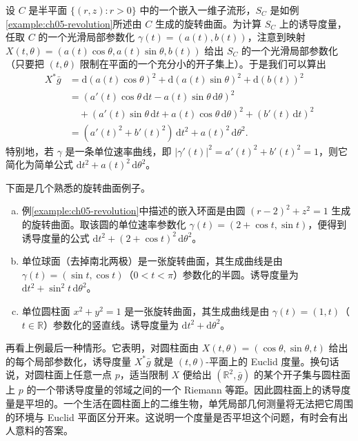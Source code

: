 \documentclass[../../main.tex]{subfiles}
\begin{document}
\begin{example}[旋转曲面上的诱导度量]\label{example:ch13-revolution}
设 $C$ 是半平面 $\{(r,z):r>0\}$ 中的一个嵌入一维子流形，$S_C$ 是如例\ref{example:ch05-revolution}所述由 $C$ 生成的旋转曲面。为计算 $S_C$ 上的诱导度量，任取 $C$ 的一个光滑局部参数化 $\gamma(t)=(a(t),b(t))$，注意到映射 $X(t,\theta)=(a(t)\cos\theta,a(t)\sin\theta,b(t))$ 给出 $S_C$ 的一个光滑局部参数化（只要把 $(t,\theta)$ 限制在平面的一个充分小的开子集上）。于是我们可以算出
\begin{align*}
X^*\bar g&=\mathrm{d}(a(t)\cos\theta)^2+\mathrm{d}(a(t)\sin\theta)^2+\mathrm{d}(b(t))^2\\
&=(a'(t)\cos\theta\,\mathrm{d}t-a(t)\sin\theta\,\mathrm{d}\theta)^2\\
&\quad+(a'(t)\sin\theta\,\mathrm{d}t+a(t)\cos\theta\,\mathrm{d}\theta)^2+(b'(t)\,\mathrm{d}t)^2\\
&=(a'(t)^2+b'(t)^2)\,\mathrm{d}t^2+a(t)^2\,\mathrm{d}\theta^2.
\end{align*}
特别地，若 $\gamma$ 是一条单位速率曲线，即 $|\gamma'(t)|^2=a'(t)^2+b'(t)^2=1$，则它简化为简单公式 $\mathrm{d}t^2+a(t)^2\,\mathrm{d}\theta^2$。

下面是几个熟悉的旋转曲面例子。
\begin{enumerate}[(a)]
\item 例\ref{example:ch05-revolution}中描述的嵌入环面是由圆 $(r-2)^2+z^2=1$ 生成的旋转曲面。取该圆的单位速率参数化 $\gamma(t)=(2+\cos t,\sin t)$，便得到诱导度量的公式 $\mathrm{d}t^2+(2+\cos t)^2\,\mathrm{d}\theta^2$。
\item 单位球面（去掉南北两极）是一张旋转曲面，其生成曲线是由 $\gamma(t)=(\sin t,\cos t)$（$0<t<\pi$）参数化的半圆。诱导度量为 $\mathrm{d}t^2+\sin^2 t\,\mathrm{d}\theta^2$。
\item 单位圆柱面 $x^2+y^2=1$ 是一张旋转曲面，其生成曲线是由 $\gamma(t)=(1,t)$（$t\in\mathbb{R}$）参数化的竖直线。诱导度量为 $\mathrm{d}t^2+\mathrm{d}\theta^2$。
\end{enumerate}
\end{example}

再看上例最后一种情形。它表明，对圆柱面由 $X(t,\theta)=(\cos\theta,\sin\theta,t)$ 给出的每个局部参数化，诱导度量 $X^*\bar g$ 就是 $(t,\theta)$-平面上的 Euclid 度量。换句话说，对圆柱面上任意一点 $p$，适当限制 $X$ 便给出 $(\mathbb{R}^2,\bar g)$ 的某个开子集与圆柱面上 $p$ 的一个带诱导度量的邻域之间的一个 Riemann 等距。因此圆柱面上的诱导度量是平坦的。一个生活在圆柱面上的二维生物，单凭局部几何测量将无法把它周围的环境与 Euclid 平面区分开来。这说明一个度量是否平坦这个问题，有时会有出人意料的答案。
\end{document}
